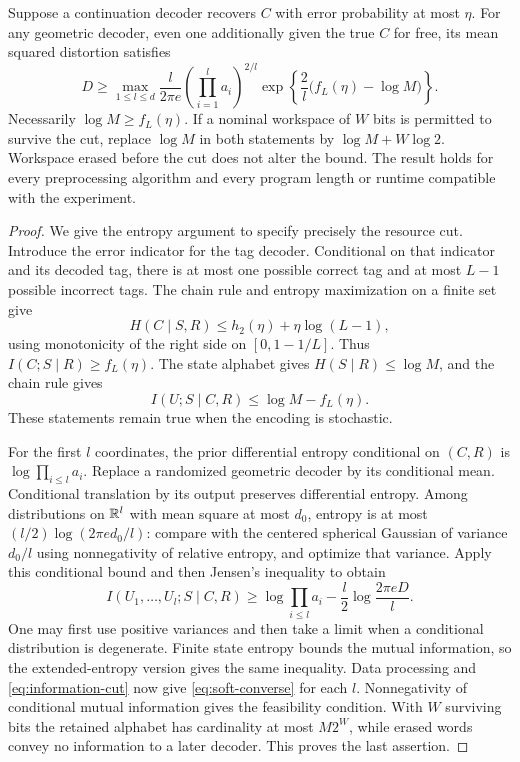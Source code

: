 \begin{theorem}\label{thm:soft-state}
Suppose a continuation decoder recovers $C$ with error probability at most $\eta$. For any geometric decoder, even one additionally given the true $C$ for free, its mean squared distortion satisfies
\begin{equation}\label{eq:soft-converse}
 D\ge\max_{1\le l\le d}\frac{l}{2\pi e}
       \left(\prod_{i=1}^l a_i\right)^{2/l}
       \exp\left\{\frac{2}{l}\big(f_L(\eta)-\log M\big)\right\}.
\end{equation}
Necessarily $\log M\ge f_L(\eta)$. If a nominal workspace of $W$ bits is permitted to survive the cut, replace $\log M$ in both statements by $\log M+W\log2$. Workspace erased before the cut does not alter the bound. The result holds for every preprocessing algorithm and every program length or runtime compatible with the experiment.
\end{theorem}
\begin{proof}
We give the entropy argument to specify precisely the resource cut. Introduce the error indicator for the tag decoder. Conditional on that indicator and its decoded tag, there is at most one possible correct tag and at most $L-1$ possible incorrect tags. The chain rule and entropy maximization on a finite set give
\[
 H(C\mid S,R)\le h_2(\eta)+\eta\log(L-1),
\]
using monotonicity of the right side on $[0,1-1/L]$. Thus $I(C;S\mid R)\ge f_L(\eta)$. The state alphabet gives $H(S\mid R)\le\log M$, and the chain rule gives
\begin{equation}\label{eq:information-cut}
 I(U;S\mid C,R)\le\log M-f_L(\eta).
\end{equation}
These statements remain true when the encoding is stochastic.

For the first $l$ coordinates, the prior differential entropy conditional on $(C,R)$ is $\log\prod_{i\le l}a_i$. Replace a randomized geometric decoder by its conditional mean. Conditional translation by its output preserves differential entropy. Among distributions on $\mathbb R^l$ with mean square at most $d_0$, entropy is at most $(l/2)\log(2\pi e d_0/l)$: compare with the centered spherical Gaussian of variance $d_0/l$ using nonnegativity of relative entropy, and optimize that variance. Apply this conditional bound and then Jensen's inequality to obtain
\[
 I(U_1,\ldots,U_l;S\mid C,R)
 \ge \log\prod_{i\le l}a_i-\frac l2\log\frac{2\pi eD}{l}.
\]
One may first use positive variances and then take a limit when a conditional distribution is degenerate. Finite state entropy bounds the mutual information, so the extended-entropy version gives the same inequality. Data processing and \eqref{eq:information-cut} now give \eqref{eq:soft-converse} for each $l$. Nonnegativity of conditional mutual information gives the feasibility condition. With $W$ surviving bits the retained alphabet has cardinality at most $M2^W$, while erased words convey no information to a later decoder. This proves the last assertion.
\end{proof}

